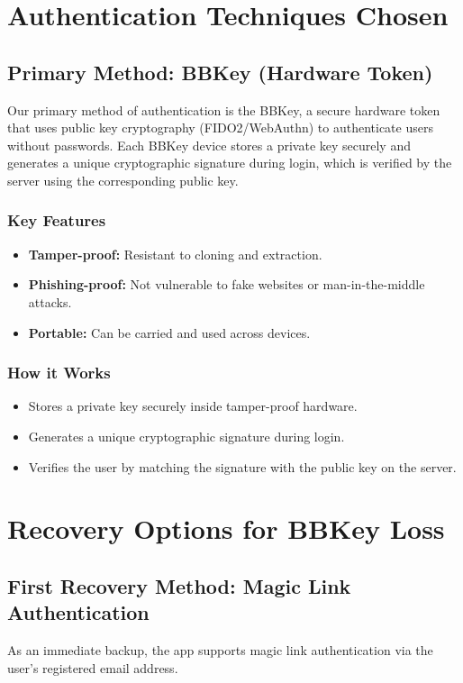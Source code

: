 \documentclass{article}[12pt]
\begin{document}
\section*{Authentication Techniques Chosen}

\subsection*{Primary Method: BBKey (Hardware Token)}
Our primary method of authentication is the BBKey, a secure hardware token that uses public key cryptography (FIDO2/WebAuthn) to authenticate users without passwords. Each BBKey device stores a private key securely and generates a unique cryptographic signature during login, which is verified by the server using the corresponding public key.

\subsubsection*{Key Features}
\begin{itemize}
    \item \textbf{Tamper-proof:} Resistant to cloning and extraction.
    \item \textbf{Phishing-proof:} Not vulnerable to fake websites or man-in-the-middle attacks.
    \item \textbf{Portable:} Can be carried and used across devices.
\end{itemize}

\subsubsection*{How it Works}
\begin{itemize}
    \item Stores a private key securely inside tamper-proof hardware.
    \item Generates a unique cryptographic signature during login.
    \item Verifies the user by matching the signature with the public key on the server.
\end{itemize}

\section*{Recovery Options for BBKey Loss}

\subsection*{First Recovery Method: Magic Link Authentication}
As an immediate backup, the app supports magic link authentication via the user’s registered email address.
\end{document}
